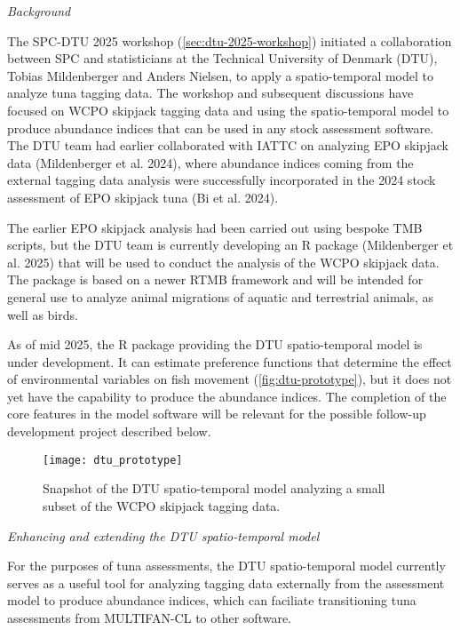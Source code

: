 \documentclass{SCreport}
\begin{document}
\vspace{1ex}

\textit{Background}

The SPC-DTU 2025 workshop (\autoref{sec:dtu-2025-workshop}) initiated a
collaboration between SPC and statisticians at the Technical University of
Denmark (DTU), Tobias Mildenberger and Anders Nielsen, to apply a
spatio-temporal model to analyze tuna tagging data. The workshop and subsequent
discussions have focused on WCPO skipjack tagging data and using the
spatio-temporal model to produce abundance indices that can be used in any stock
assessment software. The DTU team had earlier collaborated with IATTC on
analyzing EPO skipjack data (Mildenberger et al. 2024), where abundance indices
coming from the external tagging data analysis were successfully incorporated in
the 2024 stock assessment of EPO skipjack tuna (Bi et al. 2024).

The earlier EPO skipjack analysis had been carried out using bespoke TMB
scripts, but the DTU team is currently developing an R package (Mildenberger et
al. 2025) that will be used to conduct the analysis of the WCPO skipjack data.
The package is based on a newer RTMB framework and will be intended for general
use to analyze animal migrations of aquatic and terrestrial animals, as well as
birds.

As of mid 2025, the R package providing the DTU spatio-temporal model is under
development. It can estimate preference functions that determine the effect of
environmental variables on fish movement (\autoref{fig:dtu-prototype}), but it
does not yet have the capability to produce the abundance indices. The
completion of the core features in the model software will be relevant for the
possible follow-up development project described below.

\begin{figure}
  \centering
  \texttt{[image: dtu\_prototype]}
  \caption{Snapshot of the DTU spatio-temporal model analyzing a small subset of
    the WCPO skipjack tagging data.\label{fig:dtu-prototype}}
\end{figure}

\vspace{2ex}

\textit{Enhancing and extending the DTU spatio-temporal model}

For the purposes of tuna assessments, the DTU spatio-temporal model currently
serves as a useful tool for analyzing tagging data externally from the
assessment model to produce abundance indices, which can faciliate transitioning
tuna assessments from MULTIFAN-CL to other software.
\end{document}
